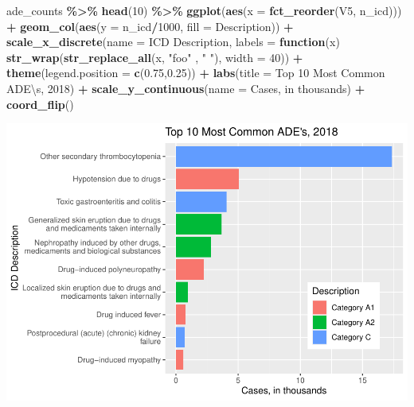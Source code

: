 \documentclass[preprint, 3p,
authoryear]{elsarticle} %
\newenvironment{Shaded}{\begin{snugshade}}{\end{snugshade}}
\newcommand{\CharTok}[1]{\textcolor[rgb]{0.31,0.60,0.02}{#1}}
\newcommand{\ControlFlowTok}[1]{\textcolor[rgb]{0.13,0.29,0.53}{\textbf{#1}}}
\newcommand{\DataTypeTok}[1]{\textcolor[rgb]{0.13,0.29,0.53}{#1}}
\newcommand{\DecValTok}[1]{\textcolor[rgb]{0.00,0.00,0.81}{#1}}
\newcommand{\FloatTok}[1]{\textcolor[rgb]{0.00,0.00,0.81}{#1}}
\newcommand{\KeywordTok}[1]{\textcolor[rgb]{0.13,0.29,0.53}{\textbf{#1}}}
\newcommand{\NormalTok}[1]{#1}
\newcommand{\OperatorTok}[1]{\textcolor[rgb]{0.81,0.36,0.00}{\textbf{#1}}}
\newcommand{\StringTok}[1]{\textcolor[rgb]{0.31,0.60,0.02}{#1}}
\begin{document}
\begin{Shaded}
\begin{Highlighting}[]
\NormalTok{ade\_counts }\OperatorTok{\%\textgreater{}\%}
\StringTok{  }\KeywordTok{head}\NormalTok{(}\DecValTok{10}\NormalTok{) }\OperatorTok{\%\textgreater{}\%}
\StringTok{  }\KeywordTok{ggplot}\NormalTok{(}\KeywordTok{aes}\NormalTok{(}\DataTypeTok{x =} \KeywordTok{fct\_reorder}\NormalTok{(V5, n\_icd))) }\OperatorTok{+}
\StringTok{  }\KeywordTok{geom\_col}\NormalTok{(}\KeywordTok{aes}\NormalTok{(}\DataTypeTok{y =}\NormalTok{ n\_icd}\OperatorTok{/}\DecValTok{1000}\NormalTok{, }\DataTypeTok{fill =}\NormalTok{ Description)) }\OperatorTok{+}\StringTok{ }
\StringTok{  }\KeywordTok{scale\_x\_discrete}\NormalTok{(}\DataTypeTok{name =} \StringTok{\textquotesingle{}ICD Description\textquotesingle{}}\NormalTok{, }\DataTypeTok{labels =} \ControlFlowTok{function}\NormalTok{(x) }\KeywordTok{str\_wrap}\NormalTok{(}\KeywordTok{str\_replace\_all}\NormalTok{(x, }\StringTok{"foo"}\NormalTok{ , }\StringTok{" "}\NormalTok{),}
                                                 \DataTypeTok{width =} \DecValTok{40}\NormalTok{)) }\OperatorTok{+}
\StringTok{  }\KeywordTok{theme}\NormalTok{(}\DataTypeTok{legend.position =} \KeywordTok{c}\NormalTok{(}\FloatTok{0.75}\NormalTok{,}\FloatTok{0.25}\NormalTok{)) }\OperatorTok{+}
\StringTok{  }\KeywordTok{labs}\NormalTok{(}\DataTypeTok{title =} \StringTok{\textquotesingle{}Top 10 Most Common ADE}\CharTok{\textbackslash{}\textquotesingle{}}\StringTok{s, 2018\textquotesingle{}}\NormalTok{) }\OperatorTok{+}
\StringTok{  }\KeywordTok{scale\_y\_continuous}\NormalTok{(}\DataTypeTok{name =} \StringTok{\textquotesingle{}Cases, in thousands\textquotesingle{}}\NormalTok{) }\OperatorTok{+}
\StringTok{  }\KeywordTok{coord\_flip}\NormalTok{() }
\end{Highlighting}
\end{Shaded}

\includegraphics{final-project-paper_files/figure-latex/top-10-ade-1.pdf}
\end{document}
